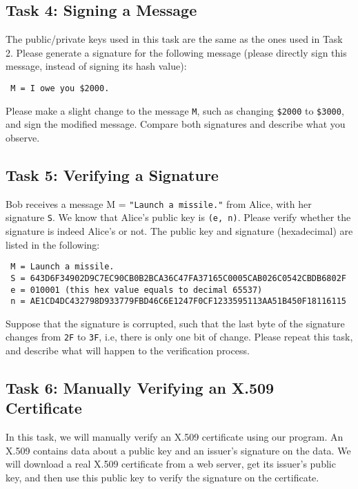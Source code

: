  

\subsection{Task 4: Signing a Message}

The public/private keys used in this task are the same as the ones used in Task 2.
Please generate a signature for the following message (please directly sign this message,
instead of signing its hash value): 

\begin{lstlisting}
 M = I owe you $2000.
\end{lstlisting}

Please make a slight change to the message \texttt{M}, such as changing \texttt{\$2000}
to \texttt{\$3000}, and sign the modified message. Compare both signatures and describe what
you observe. 
 

\subsection{Task 5: Verifying a Signature}

Bob receives a message M = \texttt{"Launch a missile."} from
Alice, with her signature \texttt{S}. We know that Alice's public key is \texttt{(e, n)}.
Please verify whether the signature is indeed Alice's or not. 
The public key and signature (hexadecimal) are listed in the following:

\begin{lstlisting}
 M = Launch a missile.
 S = 643D6F34902D9C7EC90CB0B2BCA36C47FA37165C0005CAB026C0542CBDB6802F
 e = 010001 (this hex value equals to decimal 65537)
 n = AE1CD4DC432798D933779FBD46C6E1247F0CF1233595113AA51B450F18116115 
\end{lstlisting}


Suppose that the signature is corrupted, such that the 
last byte of the signature changes from \texttt{2F} to \texttt{3F}, i.e, there is only one bit
of change.  Please repeat this task, 
and describe what will happen to the verification process. 




\subsection{Task 6: Manually Verifying an X.509 Certificate}

In this task, we will manually verify an X.509 certificate using our program. 
An X.509 contains data about a public key and an issuer's signature on the data. 
We will download a real X.509 certificate from a web server, get its issuer's public key, and then
use this public key to verify the signature on the certificate. 


